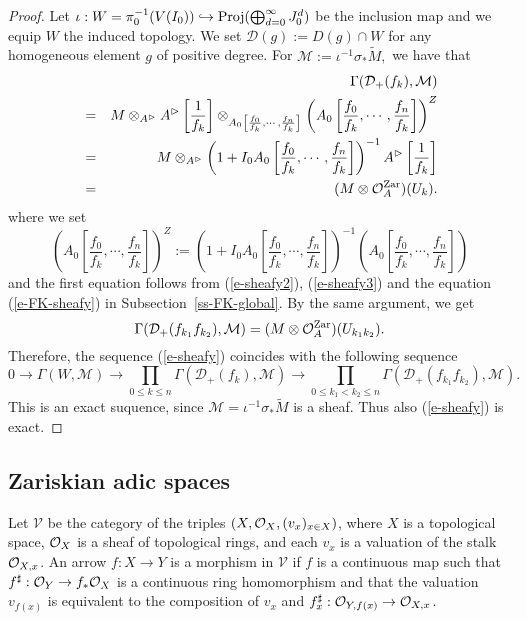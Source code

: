 \begin{proof}
Let 
$\iota: W=\pi^{-1}_0(V(I_0)) \hookrightarrow {\operatorname{Proj}}(\bigoplus_{d=0}^{\infty} J_0^d)$ be the inclusion map and we equip $W$ the induced topology. 
We set $\mathcal D(g):=D(g) \cap W$ for any homogeneous element $g$ 
of positive degree. 
For $\mathcal M:=\iota^{-1}\sigma_*\widetilde{M},$ 
we have that 
\begin{eqnarray*}
&&\Gamma(\mathcal D_+(f_k), \mathcal M)\\
&=&M \otimes_{A^{\rhd}} A^{\rhd}\left[\frac{1}{f_k}\right] 
\otimes_{A_0\left[\frac{f_0}{f_k},\cdots, \frac{f_n}{f_k}\right]}
\left(A_0\left[\frac{f_0}{f_k},\cdots, \frac{f_n}{f_k}\right]\right)^{Z}\\
&=&M \otimes_{A^{\rhd}} \left(1+I_0A_0\left[\frac{f_0}{f_k},\cdots, \frac{f_n}{f_k}\right]\right)^{-1} A^{\rhd}\left[\frac{1}{f_k}\right]\\
&=& (M \otimes \mathcal{O}_A^{{\operatorname{Zar}}})(U_k).
\end{eqnarray*}
where we set 
{\small 
$$\left(A_0\left[\frac{f_0}{f_k},\cdots, \frac{f_n}{f_k}\right]\right)^{Z}
:=\left(1+I_0A_0\left[\frac{f_0}{f_k},\cdots, \frac{f_n}{f_k}\right]\right)^{-1}
\left(A_0\left[\frac{f_0}{f_k},\cdots, \frac{f_n}{f_k}\right]\right)$$
}
and the first equation follows from 
(\ref{e-sheafy2}), (\ref{e-sheafy3}) and 
the equation (\ref{e-FK-sheafy}) in Subsection~\ref{ss-FK-global}. 
By the same argument, we get 
$$\Gamma( \mathcal D_+(f_{k_1}f_{k_2}), \mathcal M
)= (M \otimes \mathcal{O}_A^{{\operatorname{Zar}}})(U_{k_1k_2}).$$ 
Therefore, the sequence (\ref{e-sheafy}) coincides 
with the following sequence 
$$0 \to \Gamma(W, \mathcal M) 
\to \prod_{0 \leq k\leq n}  \Gamma(\mathcal D_+(f_k), \mathcal M) 
\to \prod_{0\leq k_1<k_2\leq n}  \Gamma(\mathcal D_+(f_{k_1}f_{k_2}), \mathcal M).$$
This is an exact suquence, since $\mathcal M=\iota^{-1}\sigma_*\widetilde M$ is a sheaf. 
Thus also (\ref{e-sheafy}) is exact. 
\end{proof}



\subsection{Zariskian adic spaces}\label{ss-zar-ad-sp}

Let $\mathcal V$ be the category of 
the triples $(X, \mathcal{O}_X, (v_x)_{x \in X})$, 
where $X$ is a topological space, $\mathcal{O}_X$ is a sheaf of topological rings, 
and each $v_x$ is a valuation of the stalk $\mathcal{O}_{X, x}$. 
An arrow $f:X \to Y$ is a morphism in $\mathcal V$ 
if $f$ is a continuous map such that 
$f^{\sharp}:\mathcal{O}_Y \to f_*\mathcal{O}_X$ 
is a continuous ring homomorphism and that 
the valuation $v_{f(x)}$ is equivalent to the composition of 
$v_x$ and $f^{\sharp}_x:\mathcal{O}_{Y, f(x)} \to \mathcal{O}_{X, x}$.  

